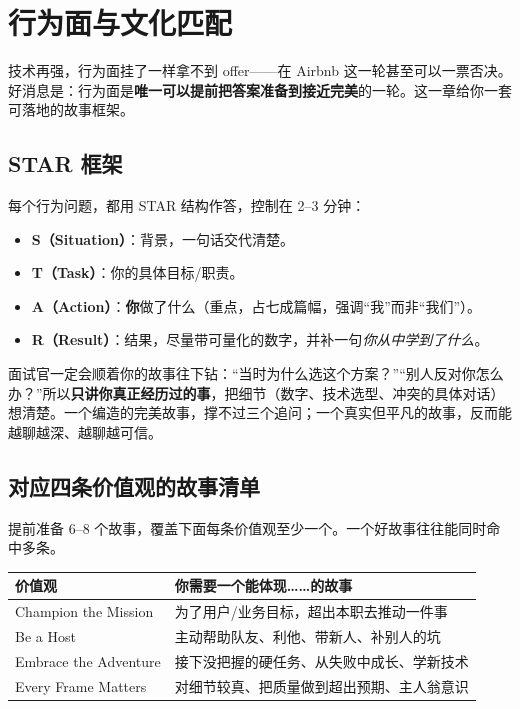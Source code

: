 \chapter{行为面与文化匹配}

技术再强，行为面挂了一样拿不到 offer——在 Airbnb 这一轮甚至可以一票否决。好消息是：行为面是\textbf{唯一可以提前把答案准备到接近完美}的一轮。这一章给你一套可落地的故事框架。

\section{STAR 框架}

每个行为问题，都用 STAR 结构作答，控制在 2--3 分钟：

\begin{itemize}
  \item \textbf{S（Situation）}：背景，一句话交代清楚。
  \item \textbf{T（Task）}：你的具体目标/职责。
  \item \textbf{A（Action）}：\textbf{你}做了什么（重点，占七成篇幅，强调“我”而非“我们”）。
  \item \textbf{R（Result）}：结果，尽量带可量化的数字，并补一句\emph{你从中学到了什么}。
\end{itemize}

\begin{idea}
面试官一定会顺着你的故事往下钻：“当时为什么选这个方案？”“别人反对你怎么办？”所以\textbf{只讲你真正经历过的事}，把细节（数字、技术选型、冲突的具体对话）想清楚。一个编造的完美故事，撑不过三个追问；一个真实但平凡的故事，反而能越聊越深、越聊越可信。
\end{idea}

\section{对应四条价值观的故事清单}

提前准备 6--8 个故事，覆盖下面每条价值观至少一个。一个好故事往往能同时命中多条。

\begin{center}
\begin{tabularx}{\linewidth}{@{}l X@{}}
\toprule
\textbf{价值观} & \textbf{你需要一个能体现……的故事} \\
\midrule
Champion the Mission & 为了用户/业务目标，超出本职去推动一件事 \\
Be a Host & 主动帮助队友、利他、带新人、补别人的坑 \\
Embrace the Adventure & 接下没把握的硬任务、从失败中成长、学新技术 \\
Every Frame Matters & 对细节较真、把质量做到超出预期、主人翁意识 \\
\bottomrule
\end{tabularx}
\end{center}

